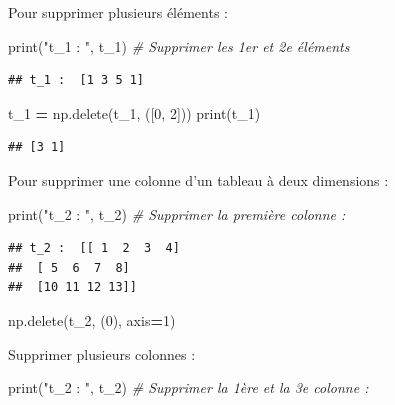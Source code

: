 \documentclass[12pt,]{book}
\newenvironment{Shaded}{\begin{snugshade}}{\end{snugshade}}
\newcommand{\DecValTok}[1]{\textcolor[rgb]{0.00,0.00,0.81}{#1}}
\newcommand{\StringTok}[1]{\textcolor[rgb]{0.31,0.60,0.02}{#1}}
\newcommand{\CommentTok}[1]{\textcolor[rgb]{0.56,0.35,0.01}{\textit{#1}}}
\newcommand{\OperatorTok}[1]{\textcolor[rgb]{0.81,0.36,0.00}{\textbf{#1}}}
\newcommand{\BuiltInTok}[1]{#1}
\newcommand{\NormalTok}[1]{#1}
\numberwithin{equation}{section}
\numberwithin{countremarque}{section}
\begin{document}
Pour supprimer plusieurs éléments :

\begin{Shaded}
\begin{Highlighting}[]
\BuiltInTok{print}\NormalTok{(}\StringTok{"t_1 : "}\NormalTok{, t_1)}
\CommentTok{# Supprimer les 1er et 2e éléments}
\end{Highlighting}
\end{Shaded}

\begin{lstlisting}
## t_1 :  [1 3 5 1]
\end{lstlisting}

\begin{Shaded}
\begin{Highlighting}[]
\NormalTok{t_1 }\OperatorTok{=}\NormalTok{ np.delete(t_1, ([}\DecValTok{0}\NormalTok{, }\DecValTok{2}\NormalTok{]))}
\BuiltInTok{print}\NormalTok{(t_1)}
\end{Highlighting}
\end{Shaded}

\begin{lstlisting}
## [3 1]
\end{lstlisting}

Pour supprimer une colonne d'un tableau à deux dimensions :

\begin{Shaded}
\begin{Highlighting}[]
\BuiltInTok{print}\NormalTok{(}\StringTok{"t_2 : "}\NormalTok{, t_2)}
\CommentTok{# Supprimer la première colonne :}
\end{Highlighting}
\end{Shaded}

\begin{lstlisting}
## t_2 :  [[ 1  2  3  4]
##  [ 5  6  7  8]
##  [10 11 12 13]]
\end{lstlisting}

\begin{Shaded}
\begin{Highlighting}[]
\NormalTok{np.delete(t_2, (}\DecValTok{0}\NormalTok{), axis}\OperatorTok{=}\DecValTok{1}\NormalTok{)}
\end{Highlighting}
\end{Shaded}

Supprimer plusieurs colonnes :

\begin{Shaded}
\begin{Highlighting}[]
\BuiltInTok{print}\NormalTok{(}\StringTok{"t_2 : "}\NormalTok{, t_2)}
\CommentTok{# Supprimer la 1ère et la 3e colonne :}
\end{Highlighting}
\end{Shaded}
\end{document}
